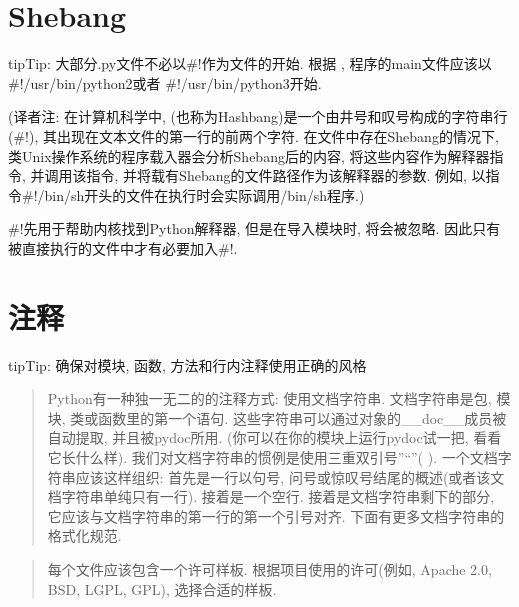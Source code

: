 \documentclass[a4paper,10pt,english]{sphinxmanual}
\begin{document}
\section{Shebang}
\label{\detokenize{python_style_rules:shebang}}
\begin{sphinxadmonition}{tip}{Tip:}
大部分.py文件不必以\#!作为文件的开始. 根据  , 程序的main文件应该以 \#!/usr/bin/python2或者 \#!/usr/bin/python3开始.
\end{sphinxadmonition}

(译者注: 在计算机科学中,  (也称为Hashbang)是一个由井号和叹号构成的字符串行(\#!), 其出现在文本文件的第一行的前两个字符. 在文件中存在Shebang的情况下, 类Unix操作系统的程序载入器会分析Shebang后的内容, 将这些内容作为解释器指令, 并调用该指令, 并将载有Shebang的文件路径作为该解释器的参数. 例如, 以指令\#!/bin/sh开头的文件在执行时会实际调用/bin/sh程序.)

\#!先用于帮助内核找到Python解释器, 但是在导入模块时, 将会被忽略. 因此只有被直接执行的文件中才有必要加入\#!.


\section{注释}
\label{\detokenize{python_style_rules:comments}}\label{\detokenize{python_style_rules:id9}}
\begin{sphinxadmonition}{tip}{Tip:}
确保对模块, 函数, 方法和行内注释使用正确的风格
\end{sphinxadmonition}

\begin{quote}

Python有一种独一无二的的注释方式: 使用文档字符串. 文档字符串是包, 模块, 类或函数里的第一个语句. 这些字符串可以通过对象的\_\_doc\_\_成员被自动提取, 并且被pydoc所用. (你可以在你的模块上运行pydoc试一把, 看看它长什么样). 我们对文档字符串的惯例是使用三重双引号”“”(  ). 一个文档字符串应该这样组织: 首先是一行以句号, 问号或惊叹号结尾的概述(或者该文档字符串单纯只有一行). 接着是一个空行. 接着是文档字符串剩下的部分, 它应该与文档字符串的第一行的第一个引号对齐. 下面有更多文档字符串的格式化规范.
\end{quote}

\begin{quote}

每个文件应该包含一个许可样板. 根据项目使用的许可(例如, Apache 2.0, BSD, LGPL, GPL), 选择合适的样板.
\end{quote}
\end{document}

